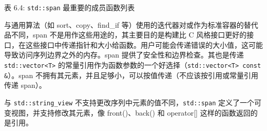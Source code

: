 \begin{center}
表 6.4: \verb|std::span| 最重要的成员函数列表
\end{center}

与通用算法（如 sort、copy、find\_if 等）使用的迭代器对或作为标准容器的替代品不同，span 不是用作这些用途的，其主要目的是构建比 C 风格接口更好的接口，在这些接口中传递指针和大小给函数。用户可能会传递错误的大小值，这可能导致访问序列边界之外的内存。span 提供了安全性和边界检查。其也是传递 \verb|std::vector<T>| 的常量引用作为函数参数的一个好选择（\verb|std::vector<T> const &|）。span 不拥有其元素，并且足够小，可以按值传递（不应该按引用或常量引用传递 span）。

与 \verb|std::string_view| 不支持更改序列中元素的值不同，\verb|std::span| 定义了一个可变视图，并支持修改其元素，像 front()、back() 和 operator[] 这样的函数返回的是引用。

